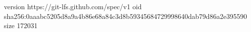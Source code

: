 version https://git-lfs.github.com/spec/v1
oid sha256:0aaabc5205d8a9a4b86e68a84c3d8b59345684729998640dab79d86a2e395590
size 172031
